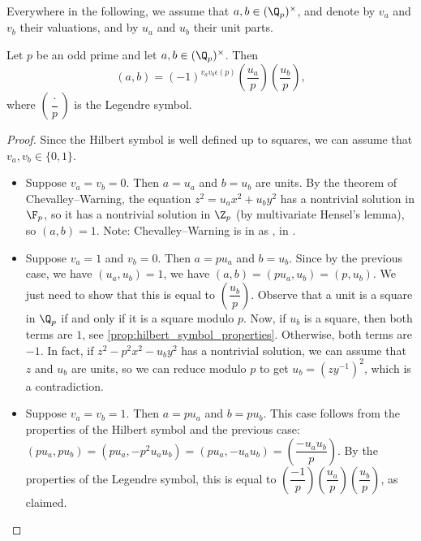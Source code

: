 Everywhere in the following, we assume that $a, b \in (\Q_p)^\times$, and denote by $v_a$ and $v_b$
their valuations, and by $u_a$ and $u_b$ their unit parts.

\begin{theorem}
	\label{thm:padic_odd_p}
	\leanok
Let $p$ be an odd prime and let $a, b \in (\Q_p)^\times$. Then
\[(a,b) = (-1)^{v_a v_b\epsilon(p)}\left(\dfrac{u_a}{p}\right) \left(\dfrac{u_b}{p}\right),\]
where $\left(\dfrac{\cdot}{p}\right)$ is the Legendre symbol.
\end{theorem}

\begin{proof}
	Since the Hilbert symbol is well defined up to squares, we can assume that $v_a, v_b \in \{0, 1\}$.
	\begin{itemize}
		\item Suppose $v_a=v_b=0$. Then $a=u_a$ and $b=u_b$ are units. By the theorem of Chevalley--Warning,
		the equation $z^2 = u_a x^2 + u_b y^2$ has a nontrivial solution in $\F_p$, so it has a
		nontrivial solution in $\Z_p$ (by multivariate Hensel's lemma), so $(a,b)=1$.
		Note: Chevalley--Warning is in \mathlib as , in .
		\item Suppose $v_a=1$ and $v_b=0$. Then $a=p u_a$ and $b=u_b$. Since by the previous case, we
		have $(u_a, u_b)=1$, we have $(a,b) = (p u_a, u_b) = (p, u_b)$. We just need to show that this is
		equal to $\left(\dfrac{u_b}{p}\right)$. Observe that a unit is a square in $\Q_p$ if and only if
		it is a square modulo $p$. Now, if $u_b$ is a square, then both terms are $1$, see
		\ref{prop:hilbert_symbol_properties}. Otherwise, both terms are $-1$. In fact,
		if $z^2-p^2x^2-u_by^2$ has a nontrivial solution, we can assume that $z$ and $u_b$ are units, so
		we can reduce modulo $p$ to get $u_b = (zy^{-1})^2$, which is a contradiction.
		\item Suppose $v_a=v_b=1$. Then $a=p u_a$ and $b=p u_b$. This case follows from the properties of
		the Hilbert symbol and the previous case: $(pu_a,pu_b)=(pu_a, -p^2u_au_b)= (pu_a, -u_au_b)=
		\left(\dfrac{-u_au_b}{p}\right)$. By the properties of the Legendre symbol, this is equal to
		$\left(\dfrac{-1}{p}\right)\left(\dfrac{u_a}{p}\right)\left(\dfrac{u_b}{p}\right)$, as claimed.
	\end{itemize}
\end{proof}

